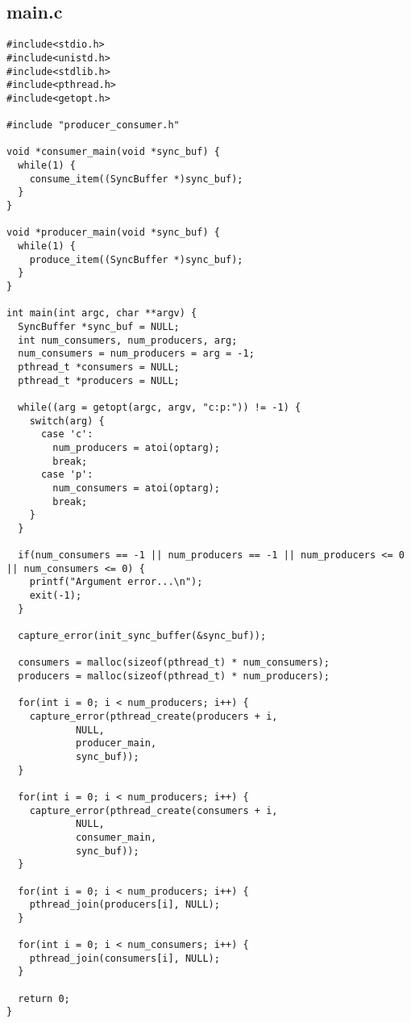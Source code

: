 \documentclass[letterpaper,10pt]{article}
\begin{document}
\subsection{main.c}
\begin{lstlisting}
#include<stdio.h>
#include<unistd.h>
#include<stdlib.h>
#include<pthread.h>
#include<getopt.h>

#include "producer_consumer.h"

void *consumer_main(void *sync_buf) {
  while(1) {
    consume_item((SyncBuffer *)sync_buf);
  }
}

void *producer_main(void *sync_buf) {
  while(1) {
    produce_item((SyncBuffer *)sync_buf);
  }
}

int main(int argc, char **argv) {
  SyncBuffer *sync_buf = NULL;
  int num_consumers, num_producers, arg;
  num_consumers = num_producers = arg = -1;
  pthread_t *consumers = NULL;
  pthread_t *producers = NULL;

  while((arg = getopt(argc, argv, "c:p:")) != -1) {
    switch(arg) {
      case 'c':
        num_producers = atoi(optarg);
        break;
      case 'p':
        num_consumers = atoi(optarg);
        break;
    }
  }

  if(num_consumers == -1 || num_producers == -1 || num_producers <= 0 || num_consumers <= 0) {
    printf("Argument error...\n");
    exit(-1);
  }

  capture_error(init_sync_buffer(&sync_buf));

  consumers = malloc(sizeof(pthread_t) * num_consumers);
  producers = malloc(sizeof(pthread_t) * num_producers);

  for(int i = 0; i < num_producers; i++) {
    capture_error(pthread_create(producers + i,
            NULL,
            producer_main,
            sync_buf));
  }
  
  for(int i = 0; i < num_producers; i++) {
    capture_error(pthread_create(consumers + i,
            NULL,
            consumer_main,
            sync_buf));
  }

  for(int i = 0; i < num_producers; i++) {
    pthread_join(producers[i], NULL);
  }

  for(int i = 0; i < num_consumers; i++) {
    pthread_join(consumers[i], NULL);
  }

  return 0;
}
\end{lstlisting}
\newpage
\end{document}

